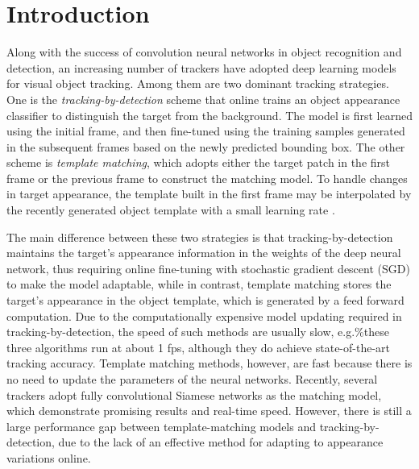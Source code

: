\documentclass[runningheads]{llncs}
\begin{document}
\section{Introduction}

Along with the success of convolution neural networks in object recognition and detection,  an increasing number of trackers \cite{Song2017, Nam2016, Wang2015, Bertinetto2016, Guo2017} have adopted deep learning models for visual object tracking. Among them are two dominant tracking strategies. One is the {\em tracking-by-detection} scheme that online trains an object appearance classifier \cite{Song2017, Nam2016} to distinguish the target from the background. The model is first learned using the initial frame, and then fine-tuned using the training samples generated in the subsequent frames based on the newly predicted bounding box. The other scheme is {\em template matching}, which adopts either the target patch in the first frame \cite{Bertinetto2016, Tao2016} or the previous frame \cite{Held2016} to construct the matching model. To handle changes in target appearance, %
the template built in the first frame may be interpolated by the recently generated object template with a small learning rate \cite{Valmadre2017}.  

The main difference between these two strategies is that tracking-by-detection maintains the target's appearance information in the weights of the deep neural network, thus requiring online fine-tuning with stochastic gradient descent (SGD) to make the model adaptable,
while in contrast, template matching stores the target's appearance in the object template, which is generated by a feed forward computation.  Due to the computationally expensive model updating required in tracking-by-detection, the speed of such methods are usually slow, e.g.\%these three algorithms
\cite{Song2017, Nam2016, Nam2016-1} run at about 1 fps,
although they do achieve state-of-the-art tracking accuracy. 
Template matching methods, however, are fast %
because there is no need to update the parameters of the neural networks. Recently, several trackers \cite{Bertinetto2016, Guo2017, Yang2017} adopt fully convolutional Siamese networks as the matching model, which demonstrate promising results and real-time speed.  However, there is still a large performance gap between template-matching models and tracking-by-detection, due to the lack of an effective method for adapting to appearance variations online.
\end{document}
